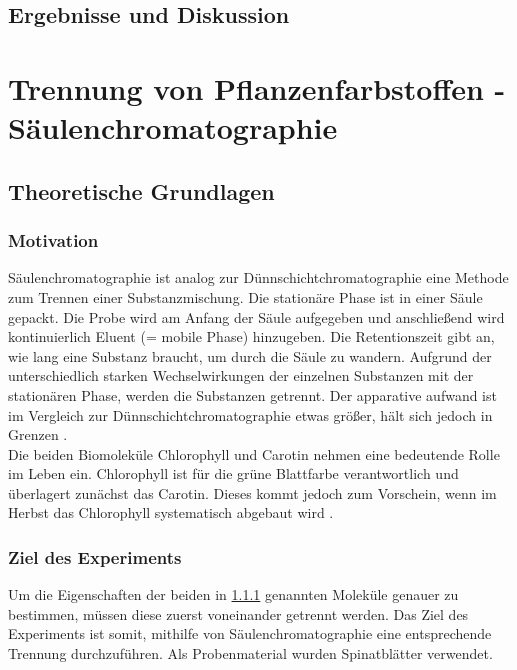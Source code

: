 \documentclass{article}
\begin{document}
    \subsection{Ergebnisse und Diskussion}
  
  \pagebreak
  
  \section{Trennung von Pflanzenfarbstoffen - Säulenchromatographie}
  
    \subsection{Theoretische Grundlagen}
    
      \subsubsection{Motivation} \label{sec:Motivationzwei}
      
        Säulenchromatographie ist analog zur Dünnschichtchromatographie eine Methode zum Trennen einer Substanzmischung. Die stationäre Phase ist in einer Säule gepackt. Die Probe wird am Anfang der Säule aufgegeben und anschließend wird kontinuierlich Eluent (= mobile Phase) hinzugeben. Die Retentionszeit gibt an, wie lang eine Substanz braucht, um durch die Säule zu wandern. Aufgrund der unterschiedlich starken Wechselwirkungen der einzelnen Substanzen mit der stationären Phase, werden die Substanzen getrennt. Der apparative aufwand ist im Vergleich zur Dünnschichtchromatographie etwas größer, hält sich jedoch in Grenzen \cite[S. 154]{TaschenatlasAnallytik}.\\
        
        Die beiden Biomoleküle Chlorophyll und Carotin nehmen eine bedeutende Rolle im Leben ein. Chlorophyll ist für die grüne Blattfarbe verantwortlich und überlagert zunächst das Carotin. Dieses kommt jedoch zum Vorschein, wenn im Herbst das Chlorophyll systematisch abgebaut wird \cite{DegradationChlorophyll}. 
      
      \subsubsection{Ziel des Experiments}
      
        Um die Eigenschaften der beiden in \ref{sec:Motivationzwei} genannten Moleküle genauer zu bestimmen, müssen diese zuerst voneinander getrennt werden. Das Ziel des Experiments ist somit, mithilfe von Säulenchromatographie eine entsprechende Trennung durchzuführen. Als Probenmaterial wurden Spinatblätter verwendet.
    
\end{document}
